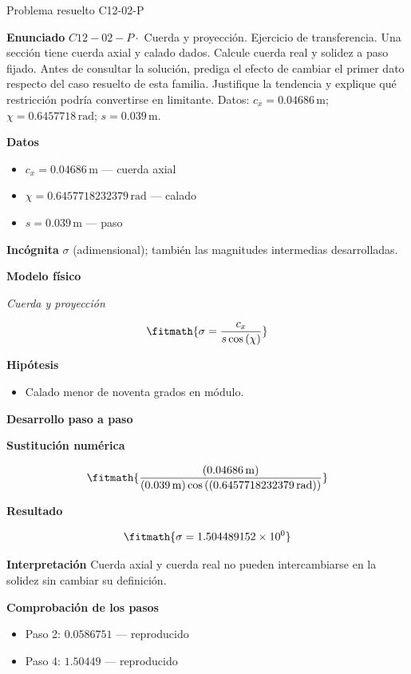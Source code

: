\documentclass[10pt,openany]{book}
\begin{document}
\begin{studiumworked}{Problema resuelto C12-02-P}


\noindent\textbf{Enunciado}
\(C12-02-P \cdot\) Cuerda y proyección. Ejercicio de transferencia. Una sección tiene cuerda axial y calado dados. Calcule cuerda real y solidez a paso fijado. Antes de consultar la solución, prediga el efecto de cambiar el primer dato respecto del caso resuelto de esta familia. Justifique la tendencia y explique qué restricción podría convertirse en limitante. Datos: \(c_x=0.04686\, \mathrm{m}\); \(\chi=0.6457718\, \mathrm{rad}\); \(s=0.039\, \mathrm{m}\).

\noindent\textbf{Datos}
\begin{itemize}
\item $c_x = 0.04686\,\mathrm{m}$ — cuerda axial
\item $\chi = 0.6457718232379\,\mathrm{rad}$ — calado
\item $s = 0.039\,\mathrm{m}$ — paso
\end{itemize}

\noindent\textbf{Incógnita}
$\sigma$ (adimensional); también las magnitudes intermedias desarrolladas.

\noindent\textbf{Modelo físico}

\noindent\textit{Cuerda y proyección}

\[
\fitmath{\sigma=\frac{c_x}{s \cos{\left(\chi \right)}}}
\]

\noindent\textbf{Hipótesis}
\begin{itemize}
\item Calado menor de noventa grados en módulo.
\end{itemize}

\noindent\textbf{Desarrollo paso a paso}



\noindent\textbf{Sustitución numérica}

\[
\fitmath{\frac{\left(0.04686\,\mathrm{m}\right)}{\left(0.039\,\mathrm{m}\right) \cos{\left(\left(0.6457718232379\,\mathrm{rad}\right) \right)}}}
\]

\noindent\textbf{Resultado}

\[
\fitmath{\sigma=1.504489152\times10^{0}}
\]

\noindent\textbf{Interpretación}
Cuerda axial y cuerda real no pueden intercambiarse en la solidez sin cambiar su definición.

\noindent\textbf{Comprobación de los pasos}
\begin{itemize}
\item Paso 2: $0.0586751$ — reproducido
\item Paso 4: $1.50449$ — reproducido
\end{itemize}


\end{studiumworked}
\end{document}
